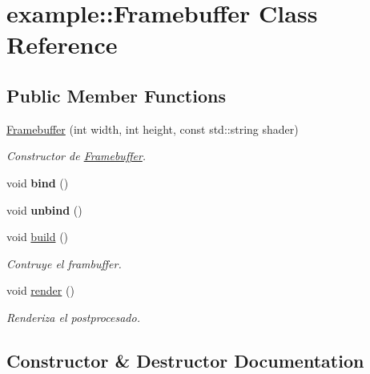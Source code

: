 \hypertarget{classexample_1_1_framebuffer}{}\section{example\+::Framebuffer Class Reference}
\label{classexample_1_1_framebuffer}
\subsection*{Public Member Functions}
\begin{DoxyCompactItemize}
\item 
\mbox{\hyperlink{classexample_1_1_framebuffer_a1e269f8e8346488dbaecf2ddb95f9f8b}{Framebuffer}} (int width, int height, const std\+::string shader)
\begin{DoxyCompactList}\small\item\em Constructor de \mbox{\hyperlink{classexample_1_1_framebuffer}{Framebuffer}}. \end{DoxyCompactList}\item 
\mbox{\label{classexample_1_1_framebuffer_ae625503a3fe2c36dc08b15ca90e55103}} 
void {\bfseries bind} ()
\item 
\mbox{\label{classexample_1_1_framebuffer_a4b9c5c28b33ad2c2fe58a393e9f1fdca}} 
void {\bfseries unbind} ()
\item 
void \mbox{\hyperlink{classexample_1_1_framebuffer_afb344567eac453092e25cce945a6a043}{build}} ()
\begin{DoxyCompactList}\small\item\em Contruye el frambuffer. \end{DoxyCompactList}\item 
void \mbox{\hyperlink{classexample_1_1_framebuffer_a7754412c4c2718232764dc20ecbbcb34}{render}} ()
\begin{DoxyCompactList}\small\item\em Renderiza el postprocesado. \end{DoxyCompactList}\end{DoxyCompactItemize}


\subsection{Constructor \& Destructor Documentation}
\mbox{\label{classexample_1_1_framebuffer_a1e269f8e8346488dbaecf2ddb95f9f8b}} 
